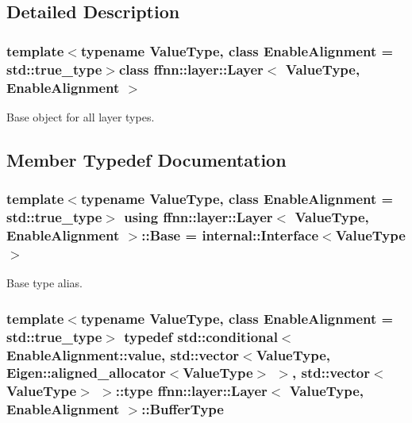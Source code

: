 \subsection{Detailed Description}
\subsubsection*{template$<$typename Value\-Type, class Enable\-Alignment = std\-::true\-\_\-type$>$class ffnn\-::layer\-::\-Layer$<$ Value\-Type, Enable\-Alignment $>$}

Base object for all layer types. 

\subsection{Member Typedef Documentation}
\hypertarget{classffnn_1_1layer_1_1_layer_aef88481ace189a82a4576931ef964f7d}{
\subsubsection[{Base}]{\setlength{\rightskip}{0pt plus 5cm}template$<$typename Value\-Type, class Enable\-Alignment = std\-::true\-\_\-type$>$ using {\bf ffnn\-::layer\-::\-Layer}$<$ Value\-Type, Enable\-Alignment $>$\-::{\bf Base} =  {\bf internal\-::\-Interface}$<$Value\-Type$>$}}\label{classffnn_1_1layer_1_1_layer_aef88481ace189a82a4576931ef964f7d}


Base type alias. 

\hypertarget{classffnn_1_1layer_1_1_layer_a981f9bea21513a7b61222b1cda9294e7}{
\subsubsection[{Buffer\-Type}]{\setlength{\rightskip}{0pt plus 5cm}template$<$typename Value\-Type, class Enable\-Alignment = std\-::true\-\_\-type$>$ typedef std\-::conditional$<$ Enable\-Alignment\-::value, std\-::vector$<$Value\-Type, Eigen\-::aligned\-\_\-allocator$<$Value\-Type$>$ $>$, std\-::vector$<$Value\-Type$>$ $>$\-::type {\bf ffnn\-::layer\-::\-Layer}$<$ Value\-Type, Enable\-Alignment $>$\-::{\bf Buffer\-Type}}}\label{classffnn_1_1layer_1_1_layer_a981f9bea21513a7b61222b1cda9294e7}


